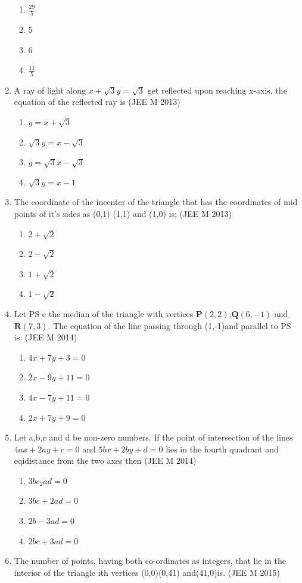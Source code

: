 \documentclass[12pt]{article}
\let\vec\mathbf
\begin{document}
\begin{enumerate}
\begin{enumerate}
\item $\frac{29}{5}$ 
\item 5 
\item 6 
\item $\frac{11}{5}$
\end{enumerate}
\item A ray of light along $x+\sqrt{3}y=\sqrt{3}$ get reflected upon reaching x-axis, the equation of the reflected ray is (JEE M 2013)
\begin{enumerate}
\item $y=x+\sqrt{3}$ 
\item $\sqrt{3}y=x-\sqrt{3}$ 
\item $y=\sqrt{3}x-\sqrt{3}$ 
\item $\sqrt{3}y=x-1$ 
\end{enumerate}
\item The coordinate of the incenter of the triangle that has the coordinates of mid points of it's sides as (0,1) (1,1) and (1,0) is; (JEE M 2013)
\begin{enumerate}
\item $2+\sqrt{2}$
\item $2-\sqrt{2}$ 
\item $1+\sqrt{2}$ 
\item $1-\sqrt{2}$
\end{enumerate}
\item Let PS e the median of the triangle with vertices $\vec{P}(2,2)$,$\vec{Q}(6,-1)$ and $\vec{R}(7,3)$. The equation of the line passing through (1,-1)and parallel to PS is: (JEE M 2014)
\begin{enumerate}
\item $4x+7y+3=0$ 
\item $2x-9y+11=0$ 
\item $4x-7y+11=0$ 
\item $2x+7y+9=0$ 
\end{enumerate}
\item Let a,b,c and d be non-zero numbers. If the point of intersection of the lines $4ax+2ay+c=0$ and $5bx+2by+d=0$ lies in the fourth quadrant and eqidistance from the two axes then (JEE M 2014)
\begin{enumerate}
\item $3bc_2ad=0$  
\item $3bc+2ad=0$
\item $2b-3ad=0$ 
\item $2bc+3ad=0$
\end{enumerate}
\item The number of points, having both co-ordinates as integers, that lie in the interior of the triangle ith vertices (0,0)(0,41) and(41,0)is. (JEE M 2015)

\end{enumerate}
\end{document}
